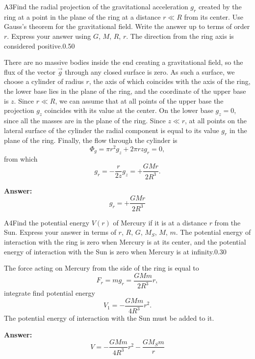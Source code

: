 \documentclass[11pt,a4paper]{article}
\begin{document}
\begin{solcard}{A3}{Find the radial projection of the gravitational acceleration $g_r$ created by the ring at a point in the plane of the ring at a distance $ r \ll R$ from its center. Use Gauss's theorem for the gravitational field. Write the answer up to terms of order $r$. Express your answer using $G$, $M$, $R$, $r$. The direction from the ring axis is considered positive.}{0.50}

There are no massive bodies inside the end creating a gravitational field, so the flux of the vector $\vec{g}$ through any closed surface is zero. As such a surface, we choose a cylinder of radius $r$, the axis of which coincides with the axis of the ring, the lower base lies in the plane of the ring, and the coordinate of the upper base is $z$. Since $r \ll R$, we can assume that at all points of the upper base the projection $g_z$ coincides with its value at the center. On the lower base $g_z = 0$, since all the masses are in the plane of the ring. Since $z \ll r$, at all points on the lateral surface of the cylinder the radial component is equal to its value $g_r$ in the plane of the ring. Finally, the flow through the cylinder is $$ \Phi_g = \pi r^2 g_z + 2\pi r z g_r = 0, $$from which $$ g_r = - \frac{r}{2z} g_z = +\frac{G M r }{ 2 R^3}. $$

\par\smallskip\noindent\textbf{Answer:} $$ g_r  = +\frac{G M r }{ 2 R^3} $$
\end{solcard}

\begin{solcard}{A4}{Find the potential energy $V(r)$ of Mercury if it is at a distance $r$ from the Sun. Express your answer in terms of $r$, $R$, $G$, $M_S$, $M$, $m$. The potential energy of interaction with the ring is zero when Mercury is at its center, and the potential energy of interaction with the Sun is zero when Mercury is at infinity.}{0.30}

The force acting on Mercury from the side of the ring is equal to $$ F_r = m g_r = \frac{GMm}{2 R^3} r, $$integrate find potential energy $$ V_1 = - \frac{GM m}{4 R^3}r^2. $$The potential energy of interaction with the Sun must be added to it.

\par\smallskip\noindent\textbf{Answer:} $$ V = - \frac{GM m}{4 R^3}r^2 - \frac{GM_S m}{r} $$
\end{solcard}
\end{document}
